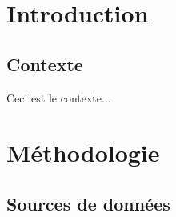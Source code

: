 \section{Introduction}
\subsection{Contexte}
Ceci est le contexte...
\section{Méthodologie}
\subsection{Sources de données}